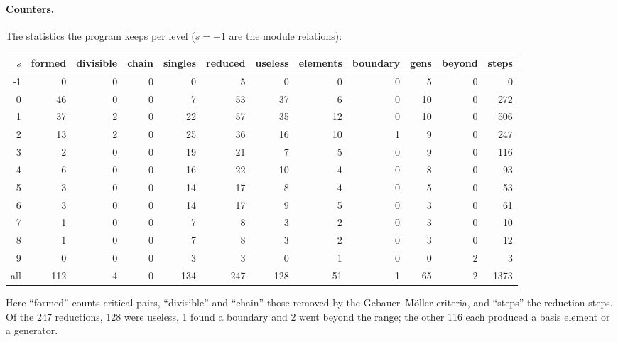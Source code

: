 \documentclass[11pt]{article}
\begin{document}
\paragraph{Counters.}
The statistics the program keeps per level ($s = -1$ are the module relations):
\begin{center}
\footnotesize\setlength{\tabcolsep}{3.5pt}
\begin{tabular}{rrrrrrrrrrrr}
\toprule
$s$ & formed & divisible & chain & singles & reduced & useless & elements & boundary & gens & beyond & steps \\
\midrule
-1 & 0 & 0 & 0 & 0 & 5 & 0 & 0 & 0 & 5 & 0 & 0 \\
0 & 46 & 0 & 0 & 7 & 53 & 37 & 6 & 0 & 10 & 0 & 272 \\
1 & 37 & 2 & 0 & 22 & 57 & 35 & 12 & 0 & 10 & 0 & 506 \\
2 & 13 & 2 & 0 & 25 & 36 & 16 & 10 & 1 & 9 & 0 & 247 \\
3 & 2 & 0 & 0 & 19 & 21 & 7 & 5 & 0 & 9 & 0 & 116 \\
4 & 6 & 0 & 0 & 16 & 22 & 10 & 4 & 0 & 8 & 0 & 93 \\
5 & 3 & 0 & 0 & 14 & 17 & 8 & 4 & 0 & 5 & 0 & 53 \\
6 & 3 & 0 & 0 & 14 & 17 & 9 & 5 & 0 & 3 & 0 & 61 \\
7 & 1 & 0 & 0 & 7 & 8 & 3 & 2 & 0 & 3 & 0 & 10 \\
8 & 1 & 0 & 0 & 7 & 8 & 3 & 2 & 0 & 3 & 0 & 12 \\
9 & 0 & 0 & 0 & 3 & 3 & 0 & 1 & 0 & 0 & 2 & 3 \\
all & 112 & 4 & 0 & 134 & 247 & 128 & 51 & 1 & 65 & 2 & 1373 \\
\bottomrule
\end{tabular}
\end{center}
Here ``formed'' counts critical pairs, ``divisible'' and ``chain'' those removed by the Gebauer--M\"oller criteria, and ``steps'' the reduction steps. Of the 247 reductions, 128 were useless, 1 found a boundary and 2 went beyond the range; the other 116 each produced a basis element or a generator.
\end{document}
